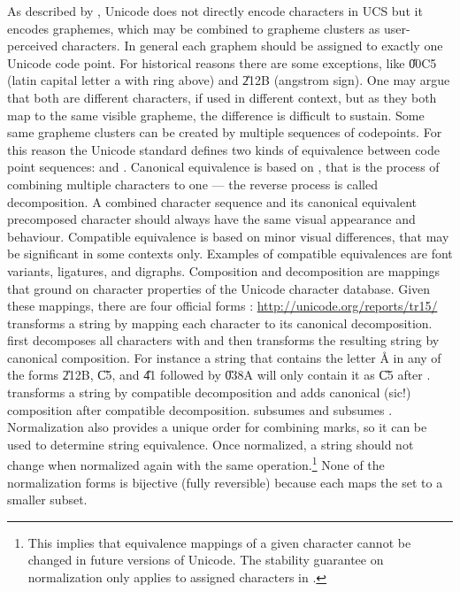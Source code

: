 As described by \textcite{Davis2010}, Unicode does not directly encode
characters in UCS but it encodes graphemes, which may be combined to grapheme
clusters as user-perceived characters. In general each graphem should be
assigned to exactly one Unicode code point. For historical reasons there are
some exceptions, like \U{00C5} (latin capital letter a with ring above) and
\U{212B} (angstrom sign). One may argue that both are different characters, if
used in different context, but as they both map to the same visible grapheme,
the difference is difficult to sustain. Some same grapheme clusters can be
created by multiple sequences of codepoints. For this reason the Unicode
standard defines two kinds of equivalence between code point sequences:
 and
. Canonical
equivalence is based on , that is the process of combining multiple characters to one ---
the reverse process is called decomposition. A combined character sequence and
its canonical equivalent precomposed character should always have the same
visual appearance and behaviour. Compatible equivalence is based on minor
visual differences, that may be significant in some contexts only. Examples of
compatible equivalences are font variants, ligatures, and digraphs.
Composition and decomposition are mappings that ground on character properties
of the Unicode character database. Given these mappings, there are four
official  forms \cite{David2009}: %
\url{http://unicode.org/reports/tr15/} 
transforms a string by mapping each character to its canonical decomposition.
 first decomposes all characters with
 and then transforms the resulting string by canonical composition.
For instance a string that contains the letter \r{A} in any of the forms
\U{212B}, \U{C5}, and \U{41} followed by \U{038A} will only contain it as
\U{C5} after .   transforms a
string by compatible decomposition and  adds
canonical (sic!) composition after compatible decomposition. 
subsumes  and  subsumes .  Normalization also
provides a unique order for combining marks, so it can be used to determine
string equivalence. Once normalized, a string should not change when normalized
again with the same operation.\footnote{This implies that equivalence mappings
of a given character cannot be changed in future versions of Unicode. The
stability guarantee on normalization only applies to assigned characters in
.} None of the normalization forms is bijective (fully reversible)
because each maps the set  to a smaller subset.


